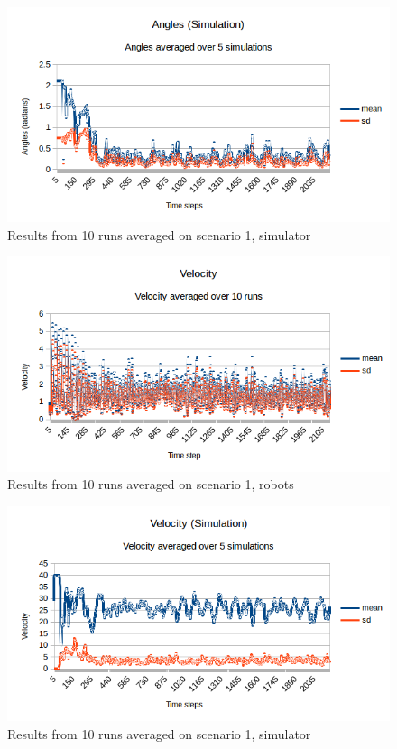 \begin{figure}[h]
\begin{center}
\includegraphics[width=0.8\linewidth]{figs/runs/1sangle}
\end{center}
\caption[1. Distances, robots]{Results from 10 runs averaged on scenario 1, simulator}
\label{fig:res1sang}
\end{figure}
\begin{figure}[h]
\begin{center}
\includegraphics[width=0.8\linewidth]{figs/runs/1pvel}
\end{center}
\caption[1. Velocity, robots]{Results from 10 runs averaged on scenario 1, robots}
\label{fig:res1pvel}
\end{figure}
\begin{figure}[h]
\begin{center}
\includegraphics[width=0.8\linewidth]{figs/runs/1svel}
\end{center}
\caption[1. Velocity, robots]{Results from 10 runs averaged on scenario 1, simulator}
\label{fig:res1svel}
\end{figure}
\clearpage
